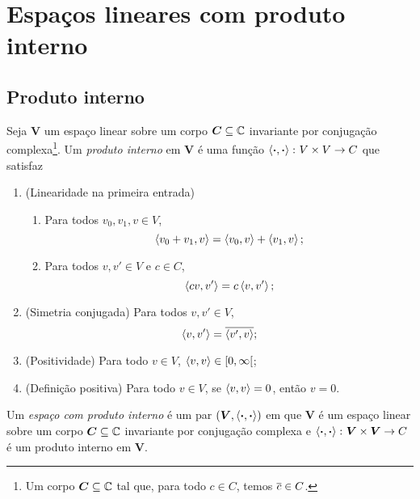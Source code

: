\chapter{Espaços lineares com produto interno}

\section{Produto interno}

\begin{definition}
Seja $\bm V$ um espaço linear sobre um corpo $\bm C \subseteq \mathbb{C}$ invariante por conjugação complexa\footnote{Um corpo $\bm C \subseteq \mathbb{C}$ tal que, para todo $c \in C$, temos $\overline{c} \in C$.}. Um \emph{produto interno} em $\bm V$ é uma função $\left\langle{\bm{\cdot}},{\bm{\cdot}}\right\rangle\colon V \times V \to C$ que satisfaz
	\begin{enumerate}
	\item (Linearidade na primeira entrada)
		\begin{enumerate}
		\item Para todos $v_0,v_1,v \in V$,
			\begin{equation*}
			\left\langle{v_0+v_1},{v}\right\rangle = \left\langle{v_0},{v}\right\rangle + \left\langle{v_1},{v}\right\rangle;
			\end{equation*}
		\item Para todos $v,v' \in V$ e $c \in C$,
			\begin{equation*}
			\left\langle{cv},{v'}\right\rangle = c\left\langle{v},{v'}\right\rangle;
			\end{equation*}
		\end{enumerate}
	\item (Simetria conjugada) Para todos $v,v' \in V$,
		\begin{equation*}
		\left\langle{v},{v'}\right\rangle = \overline{\left\langle{v'},{v}\right\rangle};
		\end{equation*}
	\item (Positividade) Para todo $v \in V$, $\left\langle{v},{v}\right\rangle \in \left[{0},{\infty}\right[$;
	\item (Definição positiva) Para todo $v \in V$, se $\left\langle{v},{v}\right\rangle=0$, então $v=0$.
		\end{enumerate}
\end{definition}

\begin{definition}
Um \emph{espaço com produto interno} é um par $(\bm V,\left\langle{\bm{\cdot}},{\bm{\cdot}}\right\rangle)$ em que $\bm V$ é um espaço linear sobre um corpo $\bm C \subseteq \mathbb{C}$ invariante por conjugação complexa e $\left\langle{\bm{\cdot}},{\bm{\cdot}}\right\rangle\colon \bm V \times \bm V \to C$ é um produto interno em $\bm V$.
\end{definition}

